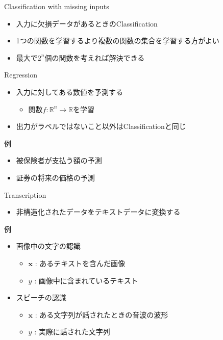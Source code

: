 \documentclass[dvipdfmx, 10pt]{beamer}
\begin{document}

\begin{frame}{Classification with missing inputs}
  \begin{itemize}
    \item 入力に欠損データがあるときのClassification
    \item 1つの関数を学習するより複数の関数の集合を学習する方がよい
    \item 最大で$2 ^ {n}$個の関数を考えれば解決できる
  \end{itemize}
\end{frame}


\begin{frame}{Regression}
  \begin{itemize}
    \item 入力に対してある数値を予測する
    \begin{itemize}
      \item 関数$f: \mathbb{R} ^ {n} \to \mathbb{R}$を学習
    \end{itemize}
    \item 出力がラベルではないこと以外はClassificationと同じ
  \end{itemize}
  \begin{exampleblock}{例}
    \begin{itemize}
      \item 被保険者が支払う額の予測
      \item 証券の将来の価格の予測
    \end{itemize}
  \end{exampleblock}
\end{frame}


\begin{frame}{Transcription}
  \begin{itemize}
    \item 非構造化されたデータをテキストデータに変換する
  \end{itemize}
  \begin{exampleblock}{例}
    \begin{itemize}
      \item 画像中の文字の認識
      \begin{itemize}
        \item $\bm{x}$ : あるテキストを含んだ画像
        \item $y$ : 画像中に含まれているテキスト
      \end{itemize}
      \item スピーチの認識
      \begin{itemize}
        \item $\bm{x}$ : ある文字列が話されたときの音波の波形
        \item $y$ : 実際に話された文字列
      \end{itemize}
    \end{itemize}
  \end{exampleblock}
\end{frame}
\end{document}
